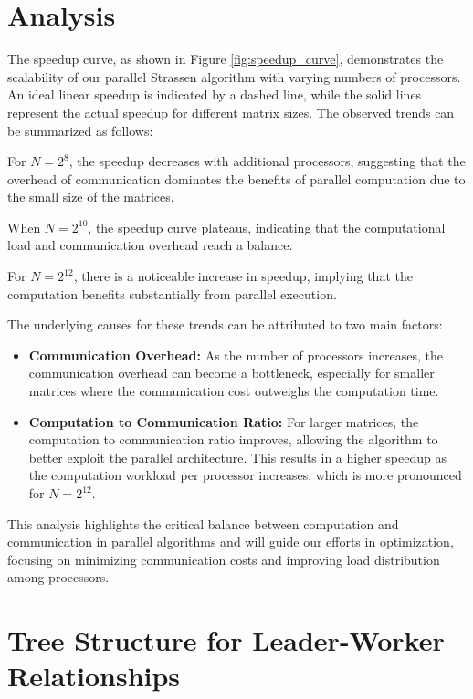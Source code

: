 \documentclass[12pt,a4paper]{article}
\begin{document}
\section{Analysis}
The speedup curve, as shown in Figure \ref{fig:speedup_curve}, demonstrates the scalability of our parallel Strassen algorithm with varying numbers of processors. An ideal linear speedup is indicated by a dashed line, while the solid lines represent the actual speedup for different matrix sizes. The observed trends can be summarized as follows:

For \(N = 2^8\), the speedup decreases with additional processors, suggesting that the overhead of communication dominates the benefits of parallel computation due to the small size of the matrices. 

When \(N = 2^{10}\), the speedup curve plateaus, indicating that the computational load and communication overhead reach a balance. 

For \(N = 2^{12}\), there is a noticeable increase in speedup, implying that the computation benefits substantially from parallel execution.

The underlying causes for these trends can be attributed to two main factors:

\begin{itemize}
    \item \textbf{Communication Overhead:} As the number of processors increases, the communication overhead can become a bottleneck, especially for smaller matrices where the communication cost outweighs the computation time.
    \item \textbf{Computation to Communication Ratio:} For larger matrices, the computation to communication ratio improves, allowing the algorithm to better exploit the parallel architecture. This results in a higher speedup as the computation workload per processor increases, which is more pronounced for \(N = 2^{12}\).
\end{itemize}

This analysis highlights the critical balance between computation and communication in parallel algorithms and will guide our efforts in optimization, focusing on minimizing communication costs and improving load distribution among processors.

\appendix
\clearpage
\section{Tree Structure for Leader-Worker Relationships}
\label{appendix:tree_structure}
\end{document}
